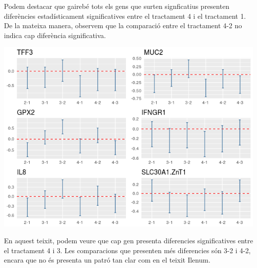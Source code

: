 \documentclass[english]{article}
\begin{document}
Podem destacar que gairebé tots els gens que surten signficatius presenten diferències estadísticament significatives entre el tractament 4 i el tractament 1. De la mateixa manera, observem que la comparació entre el tractament 4-2 no indica cap diferència significativa.
\begin{center}
\includegraphics[scale=0.8]{IleumTukey.png}
\end{center}
\clearpage
En aquest teixit, podem veure que cap gen presenta diferencies significatives entre el tractament 4 i 3. Les comparacions que presenten més diferencies són 3-2 i 4-2, encara que no és presenta un patró tan clar com en el teixit Ilenum.
\end{document}
